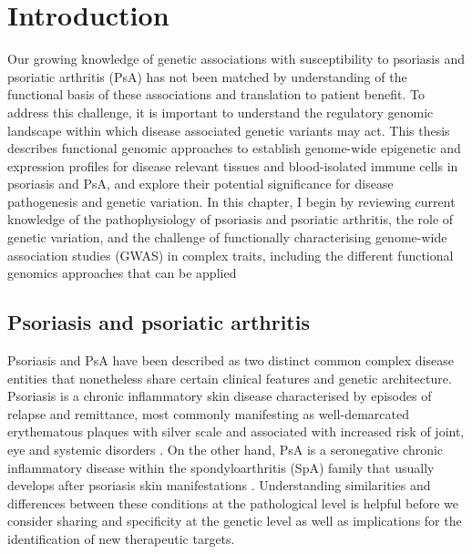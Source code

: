 \chapter{Introduction}
\label{ch:Intro}



Our growing knowledge of genetic associations with susceptibility to psoriasis and psoriatic arthritis (PsA) has not been matched by understanding of the functional basis of these associations and translation to patient benefit. To address this challenge, it is important to understand the regulatory genomic landscape within which disease associated genetic variants may act. This thesis describes functional genomic approaches to establish genome-wide epigenetic and expression  profiles for disease relevant tissues and blood-isolated immune cells  in psoriasis and PsA, and explore their potential significance for disease pathogenesis and genetic variation. In this chapter, I begin by reviewing current knowledge of the pathophysiology of psoriasis and psoriatic arthritis, the role of genetic variation, and the challenge of functionally characterising genome-wide association studies (GWAS) in complex traits, including the different functional genomics approaches that can be applied

\section{Psoriasis and psoriatic arthritis}
%
Psoriasis and PsA have been described as two distinct common complex disease entities that nonetheless share certain clinical features and genetic architecture. Psoriasis is a chronic inflammatory skin disease characterised by episodes of relapse and remittance, most commonly manifesting as well-demarcated erythematous plaques with silver scale and associated with increased risk of joint, eye and systemic disorders \parencite{Nestle2009}. On the other hand, PsA is a seronegative chronic inflammatory disease within the spondyloarthritis (SpA) family that usually develops after psoriasis skin manifestations \parencite{Moll1973, Coates2016, Villanova2013}. Understanding similarities and differences between these conditions at the pathological level is helpful before we consider sharing and specificity at the genetic level as well as implications for the identification of new therapeutic targets.


